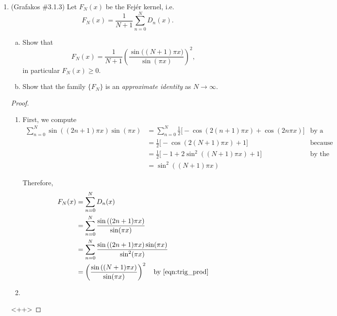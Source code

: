 \documentclass[a4paper]{article}
\begin{document}
\begin{enumerate}
\begin{proof}
\end{proof}

\item (Grafakos \#3.1.3) Let $F_N (x)$ be the Fej\'{e}r  kernel, i.e. $$ F_N (x) = \frac1{N+1} \sum_{n=0}^N D_n (x). $$

\begin{enumerate}[(a)]
\item Show that $$ F_N (x)  = \frac{1}{N+1} \left( \frac{\sin \big( (N+1) \pi x\big)}{ \sin (\pi x)} \right)^2 , $$ in particular $F_N (x) \ge 0$.
\item Show that the family $\{ F_N \}$ is an {\it{approximate identity}} as $N\rightarrow \infty$.

\end{enumerate}

\begin{proof}
  \begin{enumerate}
    \item
      First, we compute
      \begin{align}
        \sum_{n=0}^N \sin \left( (2n+1) \pi x \right) \sin ( \pi x ) &= \sum_{n=0}^N \frac{1}{2} \big[ - \cos \left( 2 (n+1) \pi x \right) + \cos
        \left( 2 n \pi x \right) \big] &\text{by a product identity} \nonumber \\
        &= \frac{1}{2} \big[ - \cos \left( 2(N+1) \pi x \right) + 1 \big] &\text{because our sum telescopes} \nonumber \\
        &= \frac{1}{2} \big[ - 1 + 2 \sin^2 \left( (N+1) \pi x \right) + 1 \big] &\text{by the double-angle formula} \nonumber \\
        &= \sin^2 \left( (N+1) \pi x \right)
        \label{eqn:trig_prod}
      \end{align}

      Therefore,
      \begin{align*}
        F_N(x) &= \sum_{n=0}^N D_n(x) \\
        &= \sum_{n=0}^N \frac{\sin \left( (2n+1) \pi x \right)}{\sin (\pi x)} \\
        &= \sum_{n=0}^N \frac{\sin \left( (2n+1) \pi x \right) \sin ( \pi x )}{\sin^2 (\pi x)} \\
        &= \left( \frac{\sin \left( (N+1) \pi x \right)}{\sin (\pi x)} \right)^2 \quad \text{by \eqref{eqn:trig_prod}}
      \end{align*}

    \item
  \end{enumerate}<++>


\end{proof}
\end{enumerate}
\end{document}

